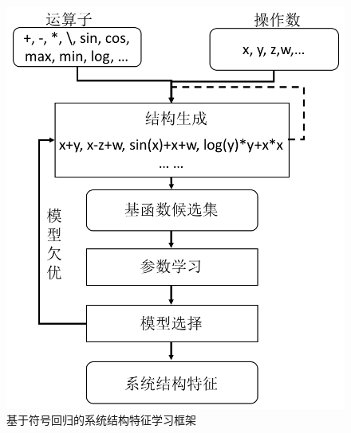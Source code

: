 \begin{figure}[H]
\centering
\includegraphics[scale=0.5]{figures/sr-anomaly-framework-feature.png}
\caption{基于符号回归的系统结构特征学习框架}
\label{fig:sr-feature}
\end{figure}

